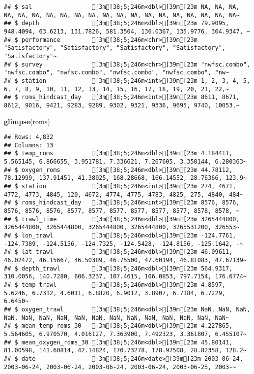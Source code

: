 \documentclass[
]{article}
\newenvironment{Shaded}{\begin{snugshade}}{\end{snugshade}}
\newcommand{\KeywordTok}[1]{\textcolor[rgb]{0.13,0.29,0.53}{\textbf{#1}}}
\newcommand{\NormalTok}[1]{#1}
\begin{document}
\begin{verbatim}
## $ sal                 [3m[38;5;246m<dbl>[39m[23m NA, NA, NA, NA, NA, NA, NA, NA, NA, NA, NA, NA, NA, NA, NA, NA, NA, NA, NA, NA~
## $ depth               [3m[38;5;246m<dbl>[39m[23m 79.9095, 948.4094, 63.6213, 131.7826, 581.3504, 136.0367, 135.9776, 304.9347, ~
## $ performance         [3m[38;5;246m<chr>[39m[23m "Satisfactory", "Satisfactory", "Satisfactory", "Satisfactory", "Satisfactory"~
## $ survey              [3m[38;5;246m<chr>[39m[23m "nwfsc.combo", "nwfsc.combo", "nwfsc.combo", "nwfsc.combo", "nwfsc.combo", "nw~
## $ station             [3m[38;5;246m<int>[39m[23m 1, 2, 3, 4, 5, 6, 7, 8, 9, 10, 11, 12, 13, 14, 15, 16, 17, 18, 19, 20, 21, 22,~
## $ roms_hindcast_day   [3m[38;5;246m<int>[39m[23m 8611, 8671, 8612, 9016, 9421, 9283, 9289, 9302, 9321, 9336, 9695, 9740, 10053,~
\end{verbatim}

\begin{Shaded}
\begin{Highlighting}[]
\KeywordTok{glimpse}\NormalTok{(roms)}
\end{Highlighting}
\end{Shaded}

\begin{verbatim}
## Rows: 4,832
## Columns: 13
## $ temp_roms           [3m[38;5;246m<dbl>[39m[23m 4.184411, 5.565145, 6.866655, 3.951781, 7.336621, 7.267605, 3.350144, 6.280363~
## $ oxygen_roms         [3m[38;5;246m<dbl>[39m[23m 44.78112, 78.12999, 137.91451, 41.38925, 168.28668, 166.14552, 28.76366, 123.9~
## $ station             [3m[38;5;246m<int>[39m[23m 274, 4671, 4772, 4773, 4845, 120, 4672, 4774, 4775, 4783, 4825, 275, 4840, 484~
## $ roms_hindcast_day   [3m[38;5;246m<int>[39m[23m 8576, 8576, 8576, 8576, 8576, 8577, 8577, 8577, 8577, 8577, 8577, 8578, 8578, ~
## $ trawl_time          [3m[38;5;246m<dbl>[39m[23m 3265444800, 3265444800, 3265444800, 3265444800, 3265444800, 3265531200, 326553~
## $ lon_trawl           [3m[38;5;246m<dbl>[39m[23m -124.7761, -124.7389, -124.5156, -124.7325, -124.5428, -124.8156, -125.1642, -~
## $ lat_trawl           [3m[38;5;246m<dbl>[39m[23m 46.09611, 46.02472, 46.15667, 46.50389, 46.75500, 47.60194, 46.81083, 47.67139~
## $ depth_trawl         [3m[38;5;246m<dbl>[39m[23m 564.9317, 310.0056, 140.7280, 606.3237, 107.4615, 106.0853, 797.7154, 176.6774~
## $ temp_trawl          [3m[38;5;246m<dbl>[39m[23m 4.8597, 5.6246, 6.7312, 4.6011, 6.8820, 6.9012, 3.8907, 6.7184, 6.7229, 6.6450~
## $ oxygen_trawl        [3m[38;5;246m<dbl>[39m[23m NaN, NaN, NaN, NaN, NaN, NaN, NaN, NaN, NaN, NaN, NaN, NaN, NaN, NaN, NaN, NaN~
## $ mean_temp_roms_30   [3m[38;5;246m<dbl>[39m[23m 4.227865, 5.564605, 6.970570, 4.016127, 7.363900, 7.492323, 3.361807, 6.455107~
## $ mean_oxygen_roms_30 [3m[38;5;246m<dbl>[39m[23m 45.80141, 81.00598, 141.60814, 42.14824, 170.73278, 178.97508, 28.82358, 128.2~
## $ date                [3m[38;5;246m<date>[39m[23m 2003-06-24, 2003-06-24, 2003-06-24, 2003-06-24, 2003-06-24, 2003-06-25, 2003-~
\end{verbatim}
\end{document}
